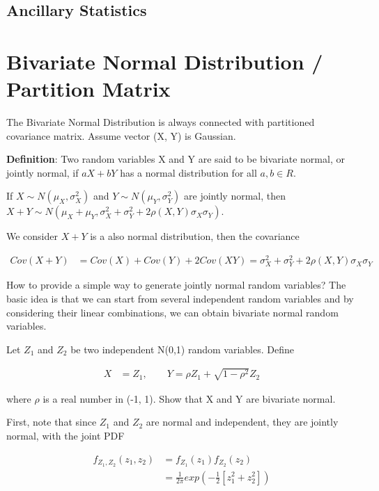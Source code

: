 \documentclass[11pt]{article} %
\begin{document}
\subsection{Ancillary Statistics}




\section{Bivariate Normal Distribution / Partition Matrix}
The Bivariate Normal Distribution is always connected with partitioned covariance matrix. Assume vector (X, Y) is Gaussian. 

\textbf{Definition}: Two random variables X and Y are said to be bivariate normal, or jointly normal, if $aX+bY$ has a normal distribution for all $a,b \in R$.

If $X \sim N( \mu_X, \sigma^2_X)$ and $Y \sim N( \mu_Y, \sigma^2_Y)$ are jointly normal, then $ X + Y  \sim N( \mu_X + \mu_Y, \sigma^2_X + \sigma^2_Y + 2 \rho(X,Y) \sigma_X \sigma_Y) $. 

We consider $X + Y$ is a also normal distribution, then the covariance 

\begin{align*}
	Cov(X+Y) &= Cov(X) + Cov(Y) + 2Cov(XY) = \sigma^2_X + \sigma^2_Y + 2 \rho(X,Y) \sigma_X \sigma_Y
\end{align*}

How to provide a simple way to generate jointly normal random variables? The basic idea is that we can start from several independent random variables and by considering their linear combinations, we can obtain bivariate normal random variables. 

Let $Z_1$ and $Z_2$ be two independent N(0,1) random variables. Define

\begin{align*}
	X &= Z_1, \qquad Y= \rho Z_1 + \sqrt{1-\rho^2} Z_2
\end{align*}

where $\rho$ is a real number in (-1, 1). Show that X and Y are bivariate normal.

First, note that since $Z_1$ and $Z_2$ are normal and independent, they are jointly normal, with the joint PDF

\begin{align*}
	f_{Z_1, Z_2} (z_1, z_2) &= f_{Z_1}(z_1) f_{Z_2}(z_2) \\
	&= \frac{1}{2 \pi} exp \left(-\frac{1}{2} [z_1^2 + z_2^2] \right)
\end{align*}
\end{document}
